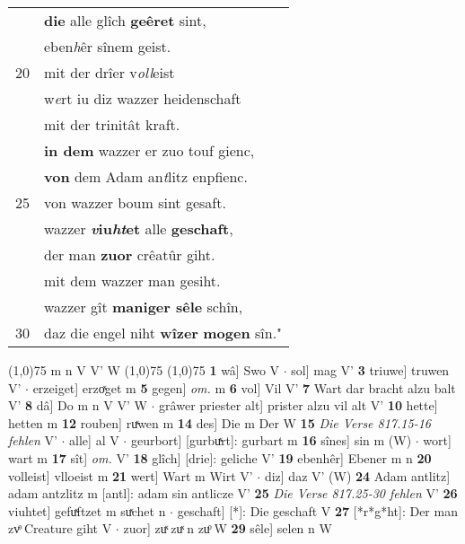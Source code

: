 \documentclass[8pt,a4paper,notitlepage]{article}
\begin{document}
\begin{table}[ht]
\begin{minipage}[t]{0.5\linewidth}
\begin{tabular}{rl}
 & \textbf{die} alle glîch \textbf{geêret} sint,\\ 
 & eben\textit{h}êr sînem geist.\\ 
20 & mit der drîer v\textit{oll}eist\\ 
 & w\textit{e}rt iu diz wazzer heidenschaft\\ 
 & mit der trinitât kraft.\\ 
 & \textbf{in dem} wazzer er zuo touf gienc,\\ 
 & \textbf{von} dem Adam an\textit{t}litz enpfienc.\\ 
25 & von wazzer boum sint gesaft.\\ 
 & wazzer \textbf{\textit{v}iu\textit{ht}et} alle \textbf{geschaft},\\ 
 & der man \textbf{zuo}\textbf{r} crêatûr giht.\\ 
 & mit dem wazzer man gesiht.\\ 
 & wazzer gît \textbf{maniger sêle} schîn,\\ 
30 & daz die engel niht \textbf{wîzer} \textbf{mogen} sîn."\\ 
\end{tabular}
\scriptsize
\line(1,0){75} \newline
m n V V' W \newline
\line(1,0){75} \newline
\newline
\line(1,0){75} \newline
\textbf{1} wâ] Swo V  $\cdot$ sol] mag V' \textbf{3} triuwe] truwen V'  $\cdot$ erzeiget] erzoͯget m \textbf{5} gegen] \textit{om.} m \textbf{6} vol] Vil V' \textbf{7} Wart dar bracht alzu balt V' \textbf{8} dâ] Do m n V V' W  $\cdot$ grâwer priester alt] prister alzu vil alt V' \textbf{10} hette] hetten m \textbf{12} rouben] ruͯwen m \textbf{14} des] Die m Der W \textbf{15} \textit{Die Verse 817.15-16 fehlen} V'   $\cdot$ alle] al V  $\cdot$ geurbort] [gurbuͯrt]: gurbart m \textbf{16} sînes] sin m (W)  $\cdot$ wort] wart m \textbf{17} sît] \textit{om.} V' \textbf{18} glîch] [drie]: geliche V' \textbf{19} ebenhêr] Ebener m n \textbf{20} volleist] vlloeist m \textbf{21} wert] Wart m Wirt V'  $\cdot$ diz] daz V' (W) \textbf{24} Adam antlitz] adam antzlitz m [antl]: adam sin antlicze V' \textbf{25} \textit{Die Verse 817.25-30 fehlen} V'  \textbf{26} viuhtet] gefuͯftzet m suͯchet n  $\cdot$ geschaft] [*]: Die geschaft V \textbf{27} [*r*g*ht]: Der man zvͦ Creature giht V  $\cdot$ zuor] zuͯ zuͯ n zuͦ W \textbf{29} sêle] selen n W \newline
\end{minipage}
\end{table}
\end{document}
